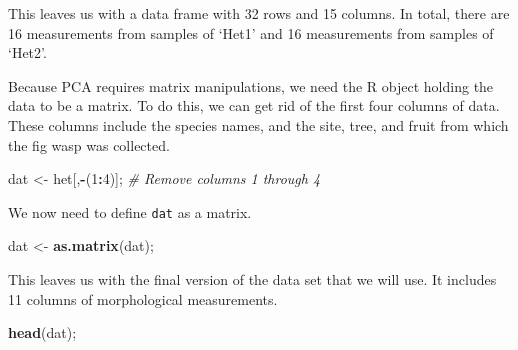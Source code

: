 \documentclass[]{article}
\newenvironment{Shaded}{\begin{snugshade}}{\end{snugshade}}
\newcommand{\CommentTok}[1]{\textcolor[rgb]{0.56,0.35,0.01}{\textit{#1}}}
\newcommand{\DecValTok}[1]{\textcolor[rgb]{0.00,0.00,0.81}{#1}}
\newcommand{\KeywordTok}[1]{\textcolor[rgb]{0.13,0.29,0.53}{\textbf{#1}}}
\newcommand{\NormalTok}[1]{#1}
\newcommand{\OperatorTok}[1]{\textcolor[rgb]{0.81,0.36,0.00}{\textbf{#1}}}
\newcommand{\StringTok}[1]{\textcolor[rgb]{0.31,0.60,0.02}{#1}}
\begin{document}
This leaves us with a data frame with 32 rows and 15 columns. In total,
there are 16 measurements from samples of `Het1' and 16 measurements
from samples of `Het2'.

Because PCA requires matrix manipulations, we need the R object holding
the data to be a matrix. To do this, we can get rid of the first four
columns of data. These columns include the species names, and the site,
tree, and fruit from which the fig wasp was collected.

\begin{Shaded}
\begin{Highlighting}[]
\NormalTok{dat <-}\StringTok{ }\NormalTok{het[,}\OperatorTok{-}\NormalTok{(}\DecValTok{1}\OperatorTok{:}\DecValTok{4}\NormalTok{)]; }\CommentTok{# Remove columns 1 through 4}
\end{Highlighting}
\end{Shaded}

We now need to define \texttt{dat} as a matrix.

\begin{Shaded}
\begin{Highlighting}[]
\NormalTok{dat <-}\StringTok{ }\KeywordTok{as.matrix}\NormalTok{(dat);}
\end{Highlighting}
\end{Shaded}

This leaves us with the final version of the data set that we will use.
It includes 11 columns of morphological measurements.

\begin{Shaded}
\begin{Highlighting}[]
\KeywordTok{head}\NormalTok{(dat);}
\end{Highlighting}
\end{Shaded}
\end{document}
